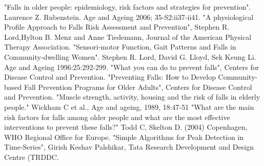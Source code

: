\begin{thebibliography}{99}
"Falls in older people: epidemiology, risk factors and strategies for prevention". Laurence Z. Rubenstein. Age and Ageing 2006; 35-S2:ii37-ii41.
"A physiological Profile Approach to Falls Risk Assessment and Prevention", Stephen R. Lord,Hylton B. Menz and Anne Tiedemann, Journal of the American Physical Therapy Association. 
"Sensori-motor Function, Gait Patterns and Falls in Community-dwelling Women". Stephen R. Lord, David G. Lloyd, Sek Keung Li. Age and Ageing 1996:25:292-299.
"What you can do to prevent falls", Centers for Disease Control and Prevention.
"Preventing Falls: How to Develop Community-based Fall Prevention Programs for Older Adults", Centers for Disease Control and Prevention.
"Muscle strength, activity, housing and the risk of falls in elderly people." Wickham C et al., Age and ageing, 1989, 18:47-51 
"What are the main risk factors for falls among older people and what are the most effective interventions to prevent these falls?" Todd C, Skelton D. (2004) Copenhagen, WHO Regional Office for Europe. 
"Simple Algorithms for Peak Detection in Time-Series", Girish Keshav Palshikar, Tata Research Development and Design Centre (TRDDC.
\end{thebibliography}
